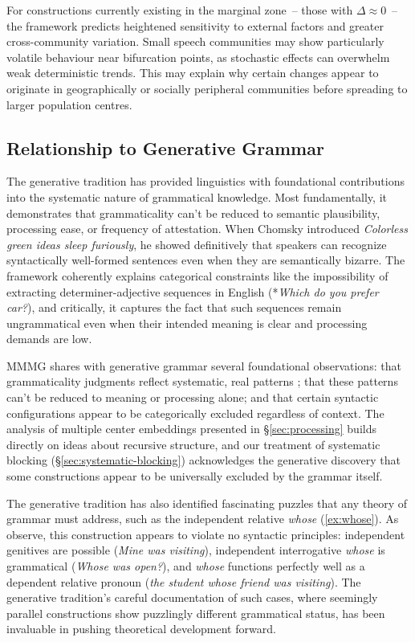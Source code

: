 \documentclass[12pt,letterpaper]{article}
\begin{document}
For constructions currently existing in the marginal zone~-- those with $\Delta \approx 0$~-- the framework predicts heightened sensitivity to external factors and greater cross-community variation. Small speech communities may show particularly volatile behaviour near bifurcation points, as stochastic effects can overwhelm weak deterministic trends. This may explain why certain changes appear to originate in geographically or socially peripheral communities before spreading to larger population centres.

\subsection{Relationship to Generative Grammar}

The generative tradition has provided linguistics with foundational contributions into the systematic nature of grammatical knowledge. Most fundamentally, it demonstrates that grammaticality can't be reduced to semantic plausibility, processing ease, or frequency of attestation. When Chomsky introduced \textit{Colorless green ideas sleep furiously}, he showed definitively that speakers can recognize syntactically well-formed sentences even when they are semantically bizarre. The framework coherently explains categorical constraints like the impossibility of extracting determiner-adjective sequences in English (*\textit{Which do you prefer car?}), and critically, it captures the fact that such sequences remain ungrammatical even when their intended meaning is clear and processing demands are low. 

MMMG shares with generative grammar several foundational observations: that grammaticality judgments reflect systematic, real patterns \autocite{Dennett1991}; that these patterns can't be reduced to meaning or processing alone; and that certain syntactic configurations appear to be categorically excluded regardless of context. The analysis of multiple center embeddings presented in \S\ref{sec:processing} builds directly on ideas about recursive structure, and our treatment of systematic blocking (\S\ref{sec:systematic-blocking}) acknowledges the generative discovery that some constructions appear to be universally excluded by the grammar itself.

The generative tradition has also identified fascinating puzzles that any theory of grammar must address, such as the independent relative \textit{whose} (\ref{ex:whose}). As \textcite{hankamer1973whose} observe, this construction appears to violate no syntactic principles: independent genitives are possible (\textit{Mine was visiting}), independent interrogative \textit{whose} is grammatical (\textit{Whose was open?}), and \textit{whose} functions perfectly well as a dependent relative pronoun (\textit{the student whose friend was visiting}). The generative tradition's careful documentation of such cases, where seemingly parallel constructions show puzzlingly different grammatical status, has been invaluable in pushing theoretical development forward.
\end{document}
